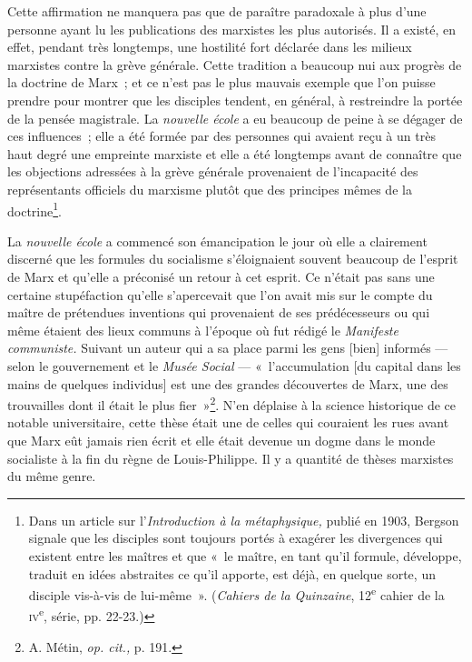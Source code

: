 \documentclass[french,twoside]{book} %
\newcommand\corr[1]{#1}
\begin{document}
\noindent Cette affirmation ne manquera pas que de paraître paradoxale à plus d’une personne ayant lu les publications des marxistes les plus autorisés. Il a existé, en effet, pendant très longtemps, une hostilité fort déclarée dans les milieux marxistes contre la grève générale. Cette tradition a beaucoup nui aux progrès de la doctrine de Marx ; et ce n’est pas le plus mauvais exemple que l’on puisse prendre pour montrer que les disciples tendent, en général, à restreindre la portée de la pensée magistrale.  La \emph{nouvelle école} a eu beaucoup de peine à se dégager de ces influences ; elle a été formée par des personnes qui avaient reçu à un très haut degré une empreinte marxiste et elle a été longtemps avant de connaître que les objections adressées à la grève générale provenaient de l’incapacité des représentants officiels du marxisme plutôt que des principes mêmes de la doctrine\footnote{ \noindent Dans un article sur l’\emph{Introduction à la métaphysique, }publié en 1903, Bergson signale que les disciples sont toujours portés à exagérer les divergences qui existent entre les maîtres et que « le maître, en tant qu’il formule, développe, traduit en idées abstraites ce qu’il apporte, est déjà, en quelque sorte, un disciple vis-à-vis de lui-même ». (\emph{Cahiers de la Quinzaine}, 12\textsuperscript{e} cahier de la {\scshape iv}\textsuperscript{e}, série, pp. 22-23.)
 }.\par
La \emph{nouvelle école} a commencé son émancipation le jour où elle a clairement discerné que les formules du socialisme s’éloignaient souvent beaucoup de l’esprit de Marx et qu’elle a préconisé un retour à cet esprit. Ce n’était pas sans une certaine stupéfaction qu’elle s’apercevait que l’on avait mis sur le compte du maître de prétendues inventions qui provenaient de ses prédécesseurs ou qui même étaient des lieux communs à l’époque où fut rédigé le \emph{Manifeste communiste.} Suivant un auteur qui a sa place parmi les gens [{\corr bien}] informés — selon le gouvernement et le \emph{Musée Social} — « l’accumulation [du capital dans les mains de quelques individus] est une des grandes découvertes de Marx, une des trouvailles dont il était le plus fier »\footnote{ \noindent A. Métin, \emph{op. cit.,} p. 191.
 }. N’en déplaise à la science historique de ce notable universitaire, cette thèse  était une de celles qui couraient les rues avant que Marx eût jamais rien écrit et elle était devenue un dogme dans le monde socialiste à la fin du règne de Louis-Philippe. Il y a quantité de thèses marxistes du même genre.\par
\end{document}
